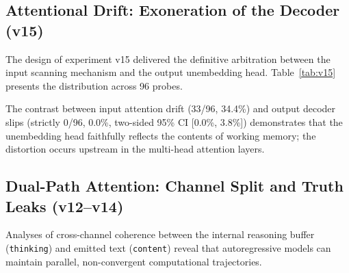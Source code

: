 \documentclass[11pt,a4paper]{article}
\begin{document}
\subsection{Attentional Drift: Exoneration of the Decoder (v15)}

The design of experiment v15 delivered the definitive arbitration between the input scanning mechanism and the output unembedding head. Table~\ref{tab:v15} presents the distribution across 96 probes.

\begin{table}[h!]
\centering
\small
{}%
\caption{Outcome distribution in Argon v15 ($N=96$, algebraic amplifier $10N - 6$).}
\label{tab:v15}
\end{table}

The contrast between input attention drift (33/96, 34.4\%) and output decoder slips (strictly 0/96, 0.0\%, two-sided 95\% CI [0.0\%, 3.8\%]) demonstrates that the unembedding head faithfully reflects the contents of working memory; the distortion occurs upstream in the multi-head attention layers.

\subsection{Dual-Path Attention: Channel Split and Truth Leaks (v12--v14)}
\label{sec:dual_path}

Analyses of cross-channel coherence between the internal reasoning buffer (\texttt{thinking}) and emitted text (\texttt{content}) reveal that autoregressive models can maintain parallel, non-convergent computational trajectories. 
\end{document}
